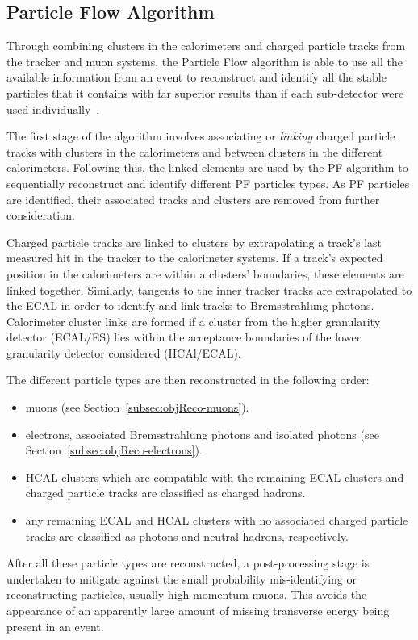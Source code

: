 \subsection{Particle Flow Algorithm}\label{subsec:PF}
Through combining clusters in the calorimeters and charged particle tracks from the tracker and muon systems, the Particle Flow algorithm is able to use all the available information from an event to reconstruct and identify all the stable particles that it contains with far superior results than if each sub-detector were used individually~\cite{CMS-PRF-14-001}.

The first stage of the algorithm involves associating or \emph{linking} charged particle tracks with clusters in the calorimeters and between clusters in the different calorimeters.
Following this, the linked elements are used by the PF algorithm to sequentially reconstruct and identify different PF particles types.
As PF particles are identified, their associated tracks and clusters are removed from further consideration.

Charged particle tracks are linked to clusters by extrapolating a track's last measured hit in the tracker to the calorimeter systems.
If a track's expected position in the calorimeters are within a clusters' boundaries, these elements are linked together.
Similarly, tangents to the inner tracker tracks are extrapolated to the ECAL in order to identify  and link tracks to Bremsstrahlung photons.
Calorimeter cluster links are formed if a cluster from the higher granularity detector (ECAL/ES) lies within the acceptance boundaries of the lower granularity detector considered (HCAl/ECAL).

The different particle types are then reconstructed in the following order: 
\begin{itemize}
\item muons (see Section~\ref{subsec:objReco-muons}).
\item electrons, associated Bremsstrahlung photons and isolated photons (see Section~\ref{subsec:objReco-electrons}).
\item HCAL clusters which are compatible with the remaining ECAL clusters and charged particle tracks are classified as charged hadrons.
\item any remaining ECAL and HCAL clusters with no associated charged particle tracks are classified as photons and neutral hadrons, respectively.
\end{itemize}

After all these particle types are reconstructed, a post-processing stage is undertaken to mitigate against the small probability mis-identifying or reconstructing particles, usually high momentum muons. 
This avoids the appearance of an apparently large amount of missing transverse energy being present in an event.


